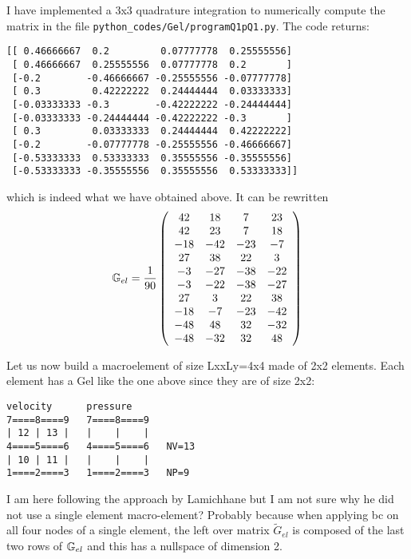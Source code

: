 I have implemented a 3x3 quadrature integration to numerically compute the matrix in the file {\tt python\_codes/Gel/programQ1pQ1.py}.
The code returns:
\begin{verbatim}
[[ 0.46666667  0.2         0.07777778  0.25555556]
 [ 0.46666667  0.25555556  0.07777778  0.2       ]
 [-0.2        -0.46666667 -0.25555556 -0.07777778]
 [ 0.3         0.42222222  0.24444444  0.03333333]
 [-0.03333333 -0.3        -0.42222222 -0.24444444]
 [-0.03333333 -0.24444444 -0.42222222 -0.3       ]
 [ 0.3         0.03333333  0.24444444  0.42222222]
 [-0.2        -0.07777778 -0.25555556 -0.46666667]
 [-0.53333333  0.53333333  0.35555556 -0.35555556]
 [-0.53333333 -0.35555556  0.35555556  0.53333333]]
\end{verbatim}
which is indeed what we have obtained above.
It can be rewritten
\[
{\mathbb{G}}_{el}=
\frac{1}{90}
\left(
\begin{array}{cccc}
 42&  18&   7&  23\\
 42&  23&   7&  18\\
-18& -42& -23&  -7\\
 27&  38&  22&   3\\
 -3& -27& -38& -22\\
 -3& -22& -38& -27\\
 27&   3&  22&  38\\
-18&  -7& -23& -42\\
-48&  48&  32& -32\\
-48& -32&  32&  48
\end{array}
\right) 
\]


Let us now build a macroelement of size LxxLy=4x4 made of 2x2 elements.
Each element has a Gel like the one above since they are of size 2x2:
\begin{verbatim}
velocity      pressure
7====8====9   7====8====9
| 12 | 13 |   |    |    |
4====5====6   4====5====6   NV=13
| 10 | 11 |   |    |    |   
1====2====3   1====2====3   NP=9
\end{verbatim}

I am here following the approach by Lamichhane \cite{lami17}
but I am not sure why he did not use a single element macro-element?
Probably because when applying bc on all four nodes of a single element, 
the left over matrix $\tilde{G}_{el}$ is composed of the last two rows of ${\mathbb{G}}_{el}$
and this has a nullspace of dimension 2.


